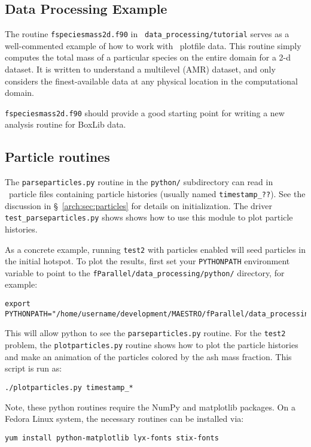 \subsection{Data Processing Example}

The routine {\tt fspeciesmass2d.f90} in {\tt
  data\_processing/tutorial} serves as a well-commented example of how
to work with \maestro\ plotfile data.  This routine simply computes
the total mass of a particular species on the entire domain for a 2-d
dataset.  It is written to understand a multilevel (AMR) dataset, and
only considers the finest-available data at any physical location in
the computational domain.

{\tt fspeciesmass2d.f90} should provide a good starting point for
writing a new analysis routine for BoxLib data.

\subsection{Particle routines}

\label{analysis:sec:particles}

The {\tt parseparticles.py} routine in the {\tt python/} subdirectory
can read in \maestro\ particle files containing particle histories
(usually named {\tt timestamp\_??}).  See the discussion in \S~\ref{arch:sec:particles} for details on initialization.  The driver {\tt
  test\_parseparticles.py} shows shows how to use this module to plot
particle histories.  

As a concrete example, running {\tt test2} with particles enabled
will seed particles in the initial hotspot.  To plot the results,
first set your {\tt PYTHONPATH} environment variable to point to the
{\tt fParallel/data\_processing/python/} directory, for example:
\begin{verbatim}
export PYTHONPATH="/home/username/development/MAESTRO/fParallel/data_processing/python"
\end{verbatim}
This will allow python to see the {\tt parseparticles.py} routine.
For the {\tt test2} problem, the {\tt plotparticles.py} routine shows
how to plot the particle histories and make an animation of the
particles colored by the ash mass fraction.  This script is run as:
\begin{verbatim}
./plotparticles.py timestamp_*
\end{verbatim}

Note, these python routines require the NumPy and matplotlib packages.
On a Fedora Linux system, the necessary routines can be installed via:
\begin{verbatim}
yum install python-matplotlib lyx-fonts stix-fonts
\end{verbatim}





